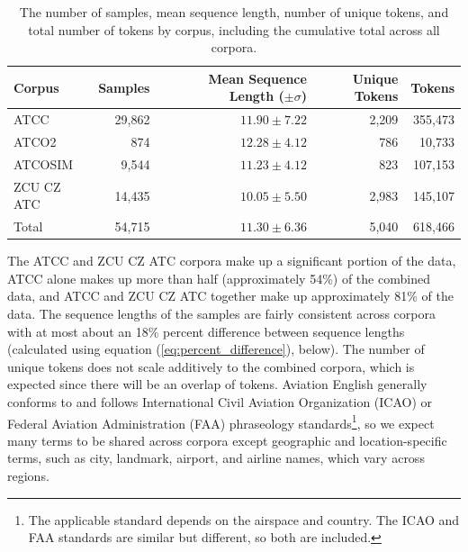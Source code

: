 \documentclass[12pt]{article}
\begin{document}
\begin{table}[!t]
    \centering
    \begin{tabular}{l r r r r}
        \toprule
        \textbf{Corpus} & \textbf{Samples} & \textbf{Mean Sequence Length (\(\pm \sigma\))} & \textbf{Unique Tokens} & \textbf{Tokens} \\
        \midrule
        ATCC            & 29,862           & \(11.90 \pm 7.22\)                             & 2,209                  & 355,473         \\
        ATCO2           & 874              & \(12.28 \pm 4.12\)                             & 786                    & 10,733          \\
        ATCOSIM         & 9,544            & \(11.23 \pm 4.12\)                             & 823                    & 107,153         \\
        ZCU CZ ATC      & 14,435           & \(10.05 \pm 5.50\)                             & 2,983                  & 145,107         \\
        \midrule
        Total           & 54,715           & \(11.30 \pm 6.36\)                             & 5,040                  & 618,466         \\
        \bottomrule
    \end{tabular}
    \caption{The number of samples, mean sequence length, number of unique tokens, and total number of tokens by corpus, including the cumulative
        total across all corpora.}
    \label{tab:corpora_stats}
\end{table}

The ATCC and ZCU CZ ATC corpora make up a significant portion of the data, ATCC alone makes up more than half (approximately 54\%) of the combined
data, and ATCC and ZCU CZ ATC together make up approximately 81\% of the data. The sequence lengths of the samples are fairly consistent across
corpora with at most about an 18\% percent difference between sequence lengths (calculated using equation (\ref{eq:percent_difference}), below). The
number of unique tokens does not scale additively to the combined corpora, which is expected since there will be an overlap of tokens. Aviation
English generally conforms to and follows International Civil Aviation Organization (ICAO) or Federal Aviation Administration (FAA) phraseology
standards\footnote{The applicable standard depends on the airspace and country. The ICAO and FAA standards are similar but different, so both are
    included.}, so we expect many terms to be shared across corpora except geographic and location-specific terms, such as city, landmark, airport,
and airline names, which vary across regions.
\end{document}
